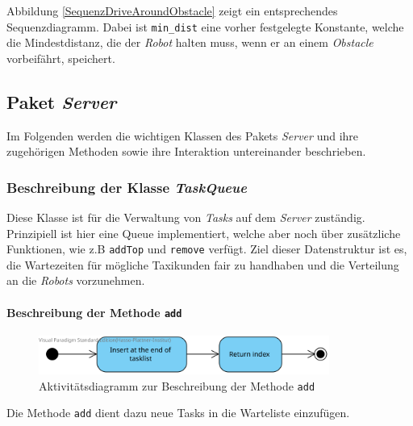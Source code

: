 			Abbildung \ref{SequenzDriveAroundObstacle} zeigt ein entsprechendes Sequenzdiagramm. 
			Dabei ist \texttt{min\_dist} eine vorher festgelegte Konstante, welche die Mindestdistanz, die der \textit{Robot} halten muss, wenn er an einem \textit{Obstacle} vorbeifährt, speichert.
	
\pagebreak
	
\subsection{Paket \textit{Server}}
	Im Folgenden werden die wichtigen Klassen des Pakets \textit{Server} 
	und ihre zugehörigen Methoden sowie ihre Interaktion untereinander beschrieben. 


	\subsubsection{Beschreibung der Klasse \textit{TaskQueue}}
	
	Diese Klasse ist für die Verwaltung von \textit{Tasks} auf dem \textit{Server} zuständig. Prinzipiell ist hier eine Queue implementiert, welche aber noch über zusätzliche Funktionen, wie z.B \texttt{addTop} und \texttt{remove} verfügt. Ziel dieser Datenstruktur ist es, die Wartezeiten für mögliche Taxikunden fair zu handhaben und die Verteilung an die \textit{Robots} vorzunehmen.
	
			\paragraph{Beschreibung der Methode \texttt{add}}		
			\begin{figure}[H]
			\centering
			\includegraphics[width=0.85\textwidth]{img/add}
			\caption{Aktivitätsdiagramm zur Beschreibung der Methode \texttt{add}}
			\label{SequenzQueueAdd}
			\end{figure}
			
			Die Methode \texttt{add} dient dazu neue Tasks in die Warteliste einzufügen.
			
